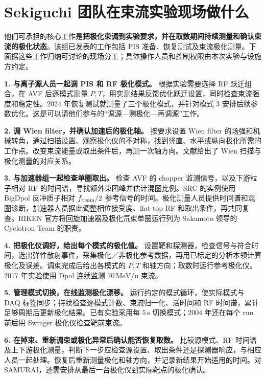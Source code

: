 \documentclass[UTF8,11pt,a4paper,fontset=none]{ctexart}
\newcommand{\unit}[1]{\,\mathrm{#1}}
\newcommand{\src}[2]{\cite[#2]{#1}}
\begin{document}
\clearpage
\section{Sekiguchi 团队在束流实验现场做什么}

他们可承担的核心工作是\textbf{把极化束调到实验要求，并在取数期间持续测量和确认束流的极化状态}。该组已发表的工作包括 PIS 准备、恢复测试及束流极化测量。下面据这些工作归纳可讨论的现场分工；具体操作人员和控制权限由本次实验与设施方约定。\src{SekiguchiLab2025}{PDF 1／文内 370，Summary of Research Activity}

\textbf{1. 与离子源人员一起调 PIS 和 RF 极化模式。}
根据实验需要选择 RF 跃迁组合，在 AVF 后逐模式测量 $P,T$，用实测结果反馈优化跃迁设置，同时检查束流强度和稳定性。2024 年恢复测试就测量了三个极化模式，并针对模式 3 安排后续参数优化。这是可以请他们参与的“调源—测极化—再调源”工作。\src{Sugahara2025}{PDF 1／文内 36，Table 2 及其后段落}

\textbf{2. 调 Wien filter，并确认加速后的极化轴。}
按要求设置 Wien filter 的场强和机械转角，通过扫描设置、观察极化仪的不对称，找到竖直、水平或纵向极化所需的工作点。改变束流能量或取出条件后，再测一次轴方向。文献给出了 Wien 扫描与极化测量的对应关系。\src{Sakamoto2016}{PDF 2／文内 146，Fig. 3}\src{Sekiguchi2017}{PDF 4，II}

\textbf{3. 与加速器组一起检查单圈取出。}
检查 AVF 的 chopper 监测信号，以及下游粒子相对 RF 的时间谱，寻找额外束团峰并估计混圈比例。SRC 的实例使用 BigDpol 反冲质子相对 $f_{\rm beam}/2$ 参考信号的时间。极化测量人员提供时间谱和混圈诊断，加速器人员据此调整相位接受度、flat-top RF 和取出条件，再共同复查。RIKEN 官方将回旋加速器及极化氘束单圈运行列为 Sakamoto 领导的 Cyclotron Team 的职责。\src{Sakamoto2016}{PDF 3／文内 147，Figs. 4--6}\src{CyclotronTeam}{网页 Research Summary，第 2、3、6 项}

\textbf{4. 把极化仪调好，给出每个模式的极化值。}
设置靶和探测器，检查信号与符合时间，选出弹性散射事件，采集极化／非极化参考数据，再用已标定的分析本领计算极化及误差。调束完成后给出各模式的 $P,T$ 和轴方向；取数时运行参考极化仪。2017 年实验使用 Dpol 连续监测 $70\unit{MeV/u}$ 束流。\src{Sekiguchi2017}{PDF 3--4，II}

\textbf{5. 管理模式切换，在线监测极化漂移。}
运行约定的模式循环，使实际模式与 DAQ 标签同步；持续检查逐模式计数、束流归一化、活时间和 RF 时间谱，累计足够周期后更新极化结果。已有实验采用每 $5\unit s$ 切换模式；2004 年还在每个 run 前后用 Swinger 极化仪检查靶前束流。\src{Sekiguchi2017}{PDF 4}\src{Sekiguchi2004}{arXiv PDF 5--6，II A--B}

\textbf{6. 在掉束、重新调束或极化异常后确认能否恢复取数。}
比较源模式、RF 时间谱及上下游极化测量，判断下一步应检查源设置、取出条件还是探测器响应，与相应人员一起处理。恢复后重新测量极化和轴方向，并记录新结果开始适用的时间。对 SAMURAI，还需安排从最后一台极化仪到实际靶点的极化确认。
\end{document}
